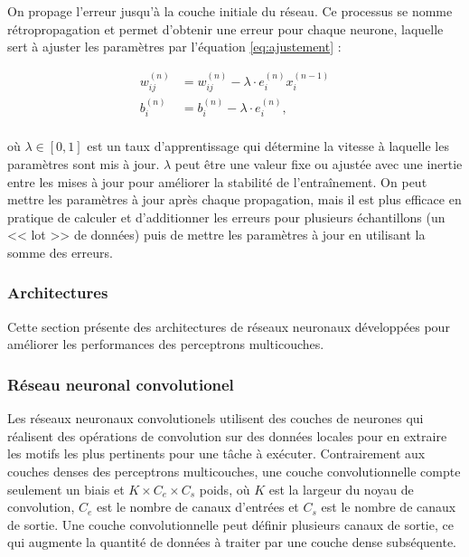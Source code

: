 On propage l'erreur jusqu'à la couche initiale du réseau. Ce processus se nomme rétropropagation et
permet d'obtenir une erreur pour chaque neurone, laquelle sert à ajuster les paramètres par
l'équation \ref{eq:ajustement} :

\begin{equation}
    \label{eq:ajustement}
    \begin{split}
        w_{ij}^{(n)} &= w_{ij}^{(n)} - \lambda \cdot e_i^{(n)} x_i^{(n - 1)} \\
        b_i^{(n)} &= b_i^{(n)} - \lambda \cdot e_i^{(n)}, \\
    \end{split}
\end{equation}

où $\lambda \in [0, 1]$ est un taux d'apprentissage qui détermine la vitesse à laquelle les
paramètres sont mis à jour. $\lambda$ peut être une valeur fixe ou ajustée avec une inertie entre
les mises à jour pour améliorer la stabilité de l'entraînement. On peut mettre les paramètres à jour
après chaque propagation, mais il est plus efficace en pratique de calculer et d'additionner les
erreurs pour plusieurs échantillons (un << lot >> de données) puis de mettre les paramètres à jour
en utilisant la somme des erreurs.

\subsubsection{Architectures}

Cette section présente des architectures de réseaux neuronaux développées pour améliorer les
performances des perceptrons multicouches.

\subsubsection{Réseau neuronal convolutionel}
Les réseaux neuronaux convolutionels \cite{goodfellow2016} \cite{krizhevsky2012} utilisent des
couches de neurones qui réalisent des opérations de convolution sur des données locales pour en
extraire les motifs les plus pertinents pour une tâche à exécuter. Contrairement aux couches denses
des perceptrons multicouches, une couche convolutionnelle compte seulement un biais et $K \times C_e
\times C_s$ poids, où $K$ est la largeur du noyau de convolution, $C_e$ est le nombre de canaux
d'entrées et $C_s$ est le nombre de canaux de sortie. Une couche convolutionnelle peut définir
plusieurs canaux de sortie, ce qui augmente la quantité de données à traiter par une couche
dense subséquente.

